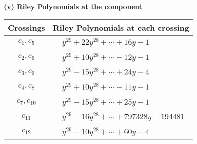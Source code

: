 \documentclass[1p]{elsarticle_modified}
\theoremstyle{definition}
\begin{document}
\newpage\renewcommand{\arraystretch}{1}
\flushleft \textbf{(v) Riley Polynomials at the component}\newline \\
\begin{tabular}{m{50pt}|m{274pt}}
Crossings & \hspace{64pt}Riley Polynomials at each crossing \\
\hline $$\begin{aligned}c_{1},c_{5}\end{aligned}$$&$\begin{aligned}
&y^{29}+22 y^{28}+\cdots+16 y-1
\end{aligned}$\\
\hline $$\begin{aligned}c_{2},c_{6}\end{aligned}$$&$\begin{aligned}
&y^{29}+10 y^{28}+\cdots-12 y-1
\end{aligned}$\\
\hline $$\begin{aligned}c_{3},c_{9}\end{aligned}$$&$\begin{aligned}
&y^{29}-15 y^{28}+\cdots+24 y-4
\end{aligned}$\\
\hline $$\begin{aligned}c_{4},c_{8}\end{aligned}$$&$\begin{aligned}
&y^{29}+10 y^{28}+\cdots-11 y-1
\end{aligned}$\\
\hline $$\begin{aligned}c_{7},c_{10}\end{aligned}$$&$\begin{aligned}
&y^{29}-15 y^{28}+\cdots+25 y-1
\end{aligned}$\\
\hline $$\begin{aligned}c_{11}\end{aligned}$$&$\begin{aligned}
&y^{29}-16 y^{28}+\cdots+797328 y-194481
\end{aligned}$\\
\hline $$\begin{aligned}c_{12}\end{aligned}$$&$\begin{aligned}
&y^{29}-10 y^{28}+\cdots+60 y-4
\end{aligned}$\\
\hline
\end{tabular}\\~\\
\end{document}
